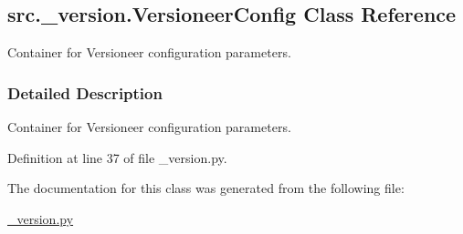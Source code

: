 \hypertarget{classsrc_1_1__version_1_1VersioneerConfig}{}\subsection{src.\+\_\+version.\+Versioneer\+Config Class Reference}
\label{classsrc_1_1__version_1_1VersioneerConfig}


Container for Versioneer configuration parameters.  




\subsubsection{Detailed Description}
Container for Versioneer configuration parameters. 



Definition at line 37 of file \+\_\+version.\+py.



The documentation for this class was generated from the following file\+:\begin{DoxyCompactItemize}
\item 
\hyperlink{__version_8py}{\+\_\+version.\+py}\end{DoxyCompactItemize}
